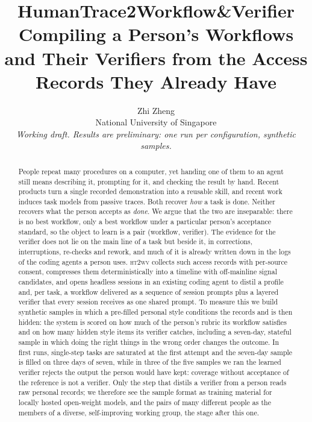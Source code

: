 \documentclass[10pt]{article}
\title{\textbf{HumanTrace2Workflow\&Verifier}\\[2pt]
\large Compiling a Person's Workflows and Their Verifiers from the Access Records They Already Have}
\author{Zhi Zheng\\ \small National University of Singapore \\ \small\emph{Working draft. Results are preliminary: one run per configuration, synthetic samples.}}
\date{}
\newcommand{\sys}{\textsc{ht2wv}}
\begin{document}
\maketitle

\begin{abstract}
People repeat many procedures on a computer, yet handing one of them to an agent still means describing it,
prompting for it, and checking the result by hand. Recent products turn a single recorded demonstration into a
reusable skill, and recent work induces task models from passive traces. Both recover \emph{how} a task is done.
Neither recovers what the person accepts as \emph{done}. We argue that the two are inseparable: there is no best
workflow, only a best workflow under a particular person's acceptance standard, so the object to learn is a pair
(workflow, verifier). The evidence for the verifier does not lie on the main line of a task but beside it, in
corrections, interruptions, re-checks and rework, and much of it is already written down in the logs of the coding
agents a person uses. \sys{} collects such access records with per-source consent, compresses them
deterministically into a timeline with off-mainline signal candidates, and opens headless sessions in an existing
coding agent to distil a profile and, per task, a workflow delivered as a sequence of session prompts plus a
layered verifier that every session receives as one shared prompt. To measure this we build synthetic samples in
which a pre-filled personal style conditions the records and is then hidden: the system is scored on how much of
the person's rubric its workflow satisfies and on how many hidden style items its verifier catches, including a
seven-day, stateful sample in which doing the right things in the wrong order changes the outcome. In first runs,
single-step tasks are saturated at the first attempt and the seven-day sample is filled on three days of seven,
while in three of the five samples we ran the learned verifier rejects the output the person would have kept:
coverage without acceptance of the reference is not a verifier. Only the step that
distils a verifier from a person reads raw personal records; we therefore see the sample format as training
material for locally hosted open-weight models, and the pairs of many different people as the members of a
diverse, self-improving working group, the stage after this one.
\end{abstract}

\end{document}
